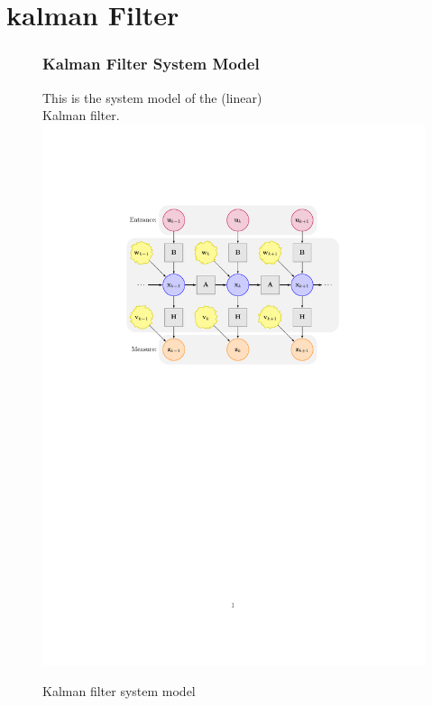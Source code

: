 \documentclass[hyperref={pdfpagelabels=true}]{beamer}
\begin{document}
\section{kalman Filter}

\begin{frame}
\begin{figure}[!htb]
\frametitle{Kalman Filter System Model}
This is the system model of the (linear) \\ Kalman filter.
\\
\includegraphics[scale = 0.5]{spherical/e.pdf} \\
\caption{Kalman filter system model}
\end{figure}
\end{frame}
\end{document}
